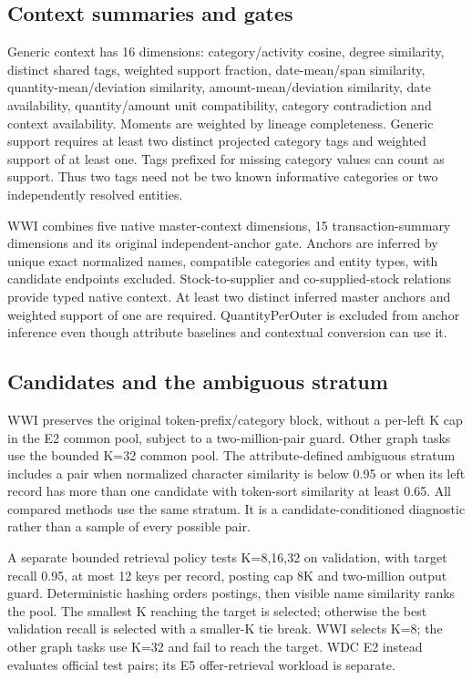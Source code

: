 \documentclass[11pt,letterpaper]{article}
\begin{document}
\subsection{Context summaries and gates}
Generic context has 16 dimensions: category/activity cosine, degree similarity, distinct shared tags, weighted support fraction, date-mean/span similarity, quantity-mean/deviation similarity, amount-mean/deviation similarity, date availability, quantity/amount unit compatibility, category contradiction and context availability. Moments are weighted by lineage completeness. Generic support requires at least two distinct projected category tags and weighted support of at least one. Tags prefixed for missing category values can count as support. Thus two tags need not be two known informative categories or two independently resolved entities.

WWI combines five native master-context dimensions, 15 transaction-summary dimensions and its original independent-anchor gate. Anchors are inferred by unique exact normalized names, compatible categories and entity types, with candidate endpoints excluded. Stock-to-supplier and co-supplied-stock relations provide typed native context. At least two distinct inferred master anchors and weighted support of one are required. QuantityPerOuter is excluded from anchor inference even though attribute baselines and contextual conversion can use it.

\subsection{Candidates and the ambiguous stratum}
WWI preserves the original token-prefix/category block, without a per-left K cap in the E2 common pool, subject to a two-million-pair guard. Other graph tasks use the bounded K=32 common pool. The attribute-defined ambiguous stratum includes a pair when normalized character similarity is below 0.95 or when its left record has more than one candidate with token-sort similarity at least 0.65. All compared methods use the same stratum. It is a candidate-conditioned diagnostic rather than a sample of every possible pair.

A separate bounded retrieval policy tests K=8,16,32 on validation, with target recall 0.95, at most 12 keys per record, posting cap 8K and two-million output guard. Deterministic hashing orders postings, then visible name similarity ranks the pool. The smallest K reaching the target is selected; otherwise the best validation recall is selected with a smaller-K tie break. WWI selects K=8; the other graph tasks use K=32 and fail to reach the target. WDC E2 instead evaluates official test pairs; its E5 offer-retrieval workload is separate.
\end{document}
